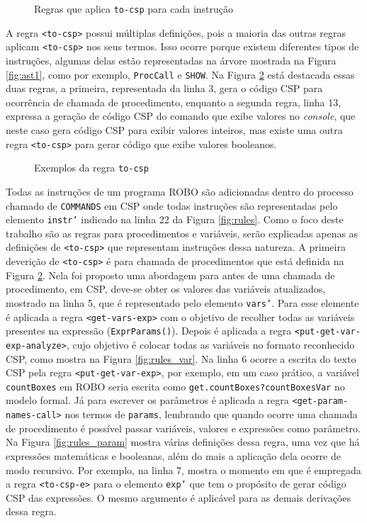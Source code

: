 \begin{figure}[h]
\centering
\caption{Regras que aplica \texttt{to-csp} para cada instrução}

\label{fig:statement}
\end{figure}

A regra \texttt{<to-csp>} possui múltiplas definições, pois a maioria das outras regras aplicam \texttt{<to-csp>} nos seus termos. Isso ocorre porque existem diferentes tipos de instruções, algumas delas estão representadas na árvore mostrada na Figura \ref{fig:ast1}, como por exemplo, \texttt{ProcCall} e \texttt{SHOW}. Na Figura \ref{fig:to_csp} está destacada essas duas regras, a primeira, representada da linha 3, gera o código CSP para ocorrência de chamada de procedimento, enquanto a segunda regra, linha 13, expressa a geração de código CSP do comando que exibe valores no \textit{console}, que neste caso gera código CSP para exibir valores inteiros, mas existe uma outra regra \texttt{<to-csp>} para gerar código que exibe valores booleanos.

\begin{figure}[h]
\centering
\caption{Exemplos da regra \texttt{to-csp}}

\label{fig:to_csp}
\end{figure}

Todas as instruções de um programa ROBO são adicionadas dentro do processo chamado de \texttt{COMMANDS} em CSP onde todas instruções são representadas pelo elemento \texttt{instr'} indicado na linha 22 da Figura \ref{fig:rules}. Como o foco deste trabalho são as regras para procedimentos e variáveis, serão explicadas apenas as definições de \texttt{<to-csp>} que representam instruções dessa natureza. A primeira deverição de \texttt{<to-csp>} é para chamada de procedimentos que está definida na Figura \ref{fig:to_csp}. Nela foi proposto uma abordagem para antes de uma chamada de procedimento, em CSP, deve-se obter os valores das variáveis atualizados, mostrado na linha 5, que é representado pelo elemento \texttt{vars'}. Para esse elemente é aplicada a regra \texttt{<get-vars-exp>} com o objetivo de recolher todas as variáveis presentes na expressão (\texttt{ExprParams()}). Depois é aplicada a regra \texttt{<put-get-var-exp-analyze>}, cujo objetivo é colocar todas as variáveis no formato reconhecido CSP, como mostra na Figura \ref{fig:rules_var}. Na linha 6 ocorre a escrita do texto CSP pela regra \texttt{<put-get-var-exp>}, por exemplo, em um caso prático, a variável \texttt{countBoxes} em ROBO seria escrita como \texttt{get.countBoxes?countBoxesVar} no modelo formal. Já para escrever os parâmetros é aplicada a regra  \texttt{<get-param-names-call>} nos termos de \texttt{params}, lembrando que quando ocorre uma chamada de procedimento é possível passar variáveis, valores e expressões como parâmetro. Na Figura \ref{fig:rules_param} mostra várias definições dessa regra, uma vez que há expressões matemáticas e booleanas, além do mais a aplicação dela ocorre de modo recursivo. Por exemplo, na linha 7, mostra o momento em que é empregada a regra \texttt{<to-csp-e>} para o elemento \texttt{exp'} que tem o propósito de gerar código CSP das expressões. O mesmo argumento é aplicável para as demais derivações dessa regra.

